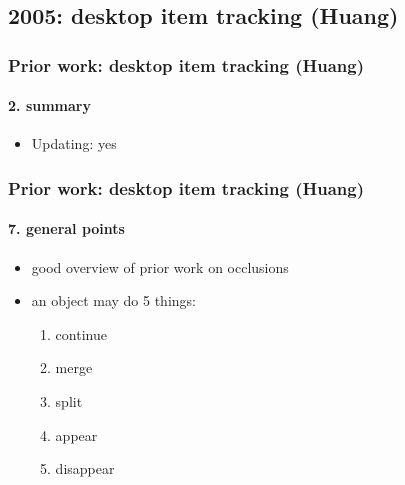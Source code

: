 \subsection{2005: desktop item tracking (Huang)}
\begin{frame}
\frametitle{Prior work: desktop item tracking (Huang)}
\framesubtitle{2. summary}
\mypagenum
{}
	\begin{itemize}
		\item {\color{red} Updating}:  yes
	\end{itemize}	
\end{frame}



\begin{frame}
\frametitle{Prior work: desktop item tracking (Huang)}
\framesubtitle{7. general points}
\mypagenum
{}
	\begin{itemize}
		\item good overview of prior work on occlusions
		\item an object may do 5 things:
			\begin{enumerate}
				\item continue
				\item merge
				\item split
				\item appear
				\item disappear
			\end{enumerate}
	\end{itemize}	
\end{frame}




